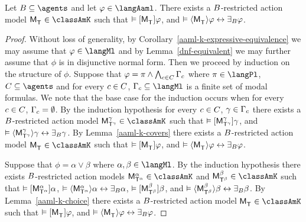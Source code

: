 \begin{theorem}\label{aaml-k-synthesis}
Let $\agentsB \subseteq \agents$ and let $\phi \in \langAaml$.
There exists a $\agentsB$-restricted action model $\aPModel{\aStatesT} \in \classAmK$ such that 
$\entails \actionA{\aPModel{\aStatesT}} \phi$, and 
$\entails \actionE{\aPModel{\aStatesT}} \phi \iff \someactsBs \phi$.
\end{theorem}

\begin{proof}
Without loss of generality, by Corollary~\ref{aaml-k-expressive-equivalence} we may assume that $\phi \in \langMl$ and by Lemma~\ref{dnf-equivalent} we may further assume that $\phi$ is in disjunctive normal form.
Then we proceed by induction on the structure of $\phi$.  
Suppose that $\phi = \pi \land \bigwedge_{\agentC \in \agentsC} \Gamma_\agentC$ where $\pi \in \langPl$, $\agentsC \subseteq \agents$ and for every $\agentC \in \agentsC$, $\Gamma_\agentC \subseteq \langMl$ is a finite set of modal formulas.
We note that the base case for the induction occurs when for every $\agentC \in \agentsC$, $\Gamma_\agentC = \emptyset$.
By the induction hypothesis for every $\agentC \in \agentsC$, $\gamma \in \Gamma_\agentC$ there exists 
a $\agentsB$-restricted action model $\aPModel[\gamma]{\aStatesT[\gamma]} \in \classAmK$ such that
$\entails \actionA{\aPModel[\gamma]{\aStatesT[\gamma]}} \gamma$, and 
$\entails \actionE{\aPModel[\gamma]{\aStatesT[\gamma]}} \gamma \iff \someactsBs \gamma$.
By Lemma~\ref{aaml-k-covers} there exists a $\agentsB$-restricted action model $\aPModel{\aStatesT} \in \classAmK$ such that 
$\entails \actionA{\aPModel{\aStatesT}} \phi$, and 
$\entails \actionE{\aPModel{\aStatesT}} \phi \iff \someactsBs \phi$.

Suppose that $\phi = \alpha \lor \beta$ where $\alpha, \beta \in \langMl$.
By the induction hypothesis there exists $\agentsB$-restricted action models
$\aPModel[\alpha]{\aStatesT[\alpha]} \in \classAmK$ and $\aPModel[\beta]{\aStatesT[\beta]} \in \classAmK$ such that 
$\entails \actionA{\aPModel[\alpha]{\aStatesT[\alpha]}} \alpha$, 
$\entails \actionE{\aPModel[\alpha]{\aStatesT[\alpha]}} \alpha \iff \someactsBs \alpha$, 
$\entails \actionA{\aPModel[\beta]{\aStatesT[\beta]}} \beta$, and 
$\entails \actionE{\aPModel[\beta]{\aStatesT[\beta]}} \beta \iff \someactsBs \beta$.
By Lemma~\ref{aaml-k-choice} there exists a $\agentsB$-restricted action model $\aPModel{\aStatesT} \in \classAmK$ such that 
$\entails \actionA{\aPModel{\aStatesT}} \phi$, and 
$\entails \actionE{\aPModel{\aStatesT}} \phi \iff \someactsBs \phi$.
\end{proof}

